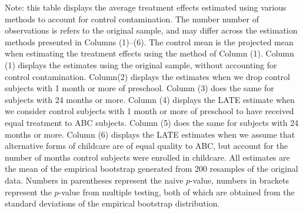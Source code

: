\begin{table}[H]
\begin{threeparttable}
\begin{tabular}{cccccccccc}
  \hline\hline
  \end{tabular}
    \begin{tablenotes}
    \scriptsize
    \item 
Note: this table displays the average treatment effects estimated using various methods to
account for control contamination. The number number of observations is refers to the 
original sample, and may differ across the estimation methods presented in Columns (1)--(6). 
The control mean is the projected mean when estimating the treatment 
effects using the method of Column (1). Column (1) displays the estimates using the original
sample, without accounting for control contamination. 
Column(2) displays the estimates when we drop control subjects with 1 month or more of preschool.
Column (3) does the same for subjects with 24 months or more. Column (4) displays the LATE
estimate when we consider control subjects with 1 month or more of preschool to have received
equal treatment to ABC subjects. Column (5) does the same for subjects with 24 months or more.
Column (6) displays the LATE estimates when we assume that alternative forms of childcare
are of equal quality to ABC, but account for the number of months control subjects were
enrolled in childcare. All estimates are the mean of the empirical bootstrap generated 
from 200 resamples of the original data. Numbers in parentheses represent the naive $p$-value,
numbers in brackets represent the $p$-value from multiple testing, both of which are obtained from 
the standard deviations of the empirical bootstrap distribution.

    \end{tablenotes}
  \end{threeparttable}

\end{table}